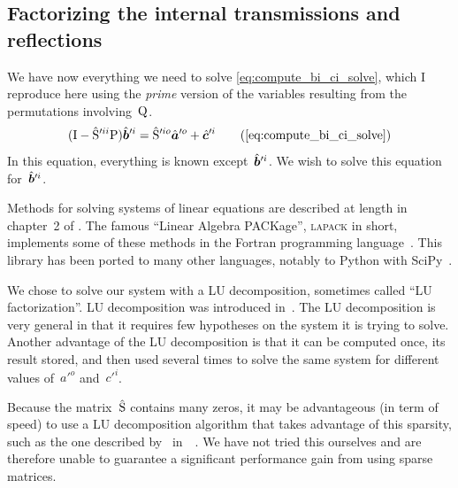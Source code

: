 
\subsection{Factorizing the internal transmissions and reflections}

We have now everything we need to solve \cref{eq:compute_bi_ci_solve}, which I reproduce here using the \textit{prime} version of the variables resulting from the permutations involving~$\mathrm{Q}$.
\begin{equation}
    (\matr{I} - \matrcp{S}'^{ii}\matr{P})\vectcp{b}'^i =
    \matrcp{S}'^{io} \vectcp{a}'^o + \vectcp{c}'^i
    \tag{\ref{eq:compute_bi_ci_solve}}
\end{equation}
In this equation, everything is known except~$\hat{\bm{b}}'^i$.
We wish to solve this equation for~$\hat{\bm{b}}'^i$.

Methods for solving systems of linear equations are described at length in chapter~2 of \textcite{Press:2007:NRE:1403886}.
The famous ``Linear Algebra PACKage'', \textsc{lapack} in short, implements some of these methods in the Fortran programming language~\parencite{lapack}.
This library has been ported to many other languages, notably to Python with SciPy~\parencite{scipy}.

We chose to solve our system with a LU decomposition, sometimes called ``LU factorization''.
LU decomposition was introduced in~\textcite{turing1948rounding}.
The LU decomposition is very general in that it requires few hypotheses on the system it is trying to solve.
Another advantage of the LU decomposition is that it can be computed once, its result stored, and then used several times to solve the same system for different values of~$a'^o$ and~$c'^i$.

Because the matrix~$\hat{\mathrm{S}}$ contains many zeros, it may be advantageous (in term of speed) to use a LU decomposition algorithm that takes advantage of this sparsity, such as the one described by~\citeauthor{dongarra2001recursive} in~~\cite{dongarra2001recursive}.
We have not tried this ourselves and are therefore unable to guarantee a significant performance gain from using sparse matrices.

